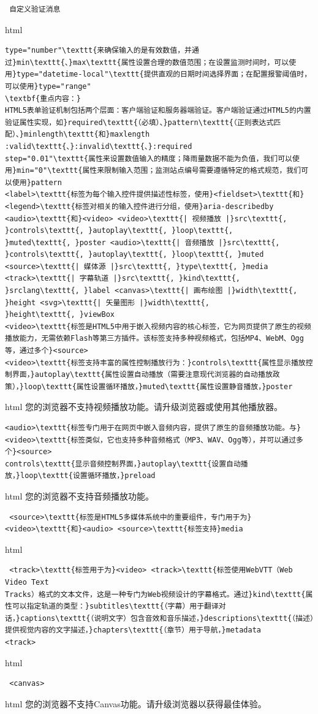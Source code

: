 \begin{lstlisting} 自定义验证消息 \end{lstlisting} html \begin{lstlisting}
type="number"\texttt{来确保输入的是有效数值，并通过}min\texttt{、}max\texttt{属性设置合理的数值范围；在设置监测时间时，可以使用}type="datetime-local"\texttt{提供直观的日期时间选择界面；在配置报警阈值时，可以使用}type="range"
\textbf{重点内容：}
HTML5表单验证机制包括两个层面：客户端验证和服务器端验证。客户端验证通过HTML5的内置验证属性实现，如}required\texttt{（必填）、}pattern\texttt{（正则表达式匹配）、}minlength\texttt{和}maxlength
:valid\texttt{、}:invalid\texttt{、}:required
step="0.01"\texttt{属性来设置数值输入的精度；降雨量数据不能为负值，我们可以使用}min="0"\texttt{属性来限制输入范围；监测站点编号需要遵循特定的格式规范，我们可以使用}pattern
<label>\texttt{标签为每个输入控件提供描述性标签，使用}<fieldset>\texttt{和}<legend>\texttt{标签对相关的输入控件进行分组，使用}aria-describedby
<audio>\texttt{和}<video> <video>\texttt{| 视频播放 |}src\texttt{, }controls\texttt{, }autoplay\texttt{, }loop\texttt{,
}muted\texttt{, }poster <audio>\texttt{| 音频播放 |}src\texttt{, }controls\texttt{, }autoplay\texttt{, }loop\texttt{, }muted
<source>\texttt{| 媒体源 |}src\texttt{, }type\texttt{, }media <track>\texttt{| 字幕轨道 |}src\texttt{, }kind\texttt{,
}srclang\texttt{, }label <canvas>\texttt{| 画布绘图 |}width\texttt{, }height <svg>\texttt{| 矢量图形 |}width\texttt{,
}height\texttt{, }viewBox
<video>\texttt{标签是HTML5中用于嵌入视频内容的核心标签，它为网页提供了原生的视频播放能力，无需依赖Flash等第三方插件。该标签支持多种视频格式，包括MP4、WebM、Ogg等，通过多个}<source>
<video>\texttt{标签支持丰富的属性控制播放行为：}controls\texttt{属性显示播放控制界面，}autoplay\texttt{属性设置自动播放（需要注意现代浏览器的自动播放政策），}loop\texttt{属性设置循环播放，}muted\texttt{属性设置静音播放，}poster
\end{lstlisting} html 您的浏览器不支持视频播放功能。请升级浏览器或使用其他播放器。 \begin{lstlisting}
<audio>\texttt{标签专门用于在网页中嵌入音频内容，提供了原生的音频播放功能。与}<video>\texttt{标签类似，它也支持多种音频格式（MP3、WAV、Ogg等），并可以通过多个}<source>
controls\texttt{显示音频控制界面，}autoplay\texttt{设置自动播放，}loop\texttt{设置循环播放，}preload \end{lstlisting} html 您的浏览器不支持音频播放功能。
\begin{lstlisting} <source>\texttt{标签是HTML5多媒体系统中的重要组件，专门用于为}<video>\texttt{和}<audio> <source>\texttt{标签支持}media
\end{lstlisting} html \begin{lstlisting} <track>\texttt{标签用于为}<video> <track>\texttt{标签使用WebVTT（Web Video Text
Tracks）格式的文本文件，这是一种专门为Web视频设计的字幕格式。通过}kind\texttt{属性可以指定轨道的类型：}subtitles\texttt{（字幕）用于翻译对话，}captions\texttt{（说明文字）包含音效和音乐描述，}descriptions\texttt{（描述）提供视觉内容的文字描述，}chapters\texttt{（章节）用于导航，}metadata
<track> \end{lstlisting} html \begin{lstlisting} <canvas> \end{lstlisting} html 您的浏览器不支持Canvas功能。请升级浏览器以获得最佳体验。
